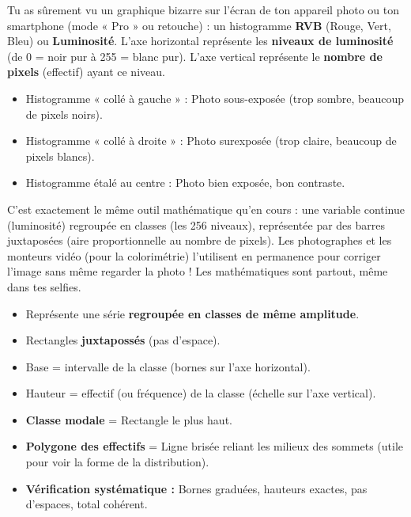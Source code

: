 \documentclass[11pt]{article}
\begin{document}
\begin{savaistu}
Tu as sûrement vu un graphique bizarre sur l'écran de ton appareil photo ou ton smartphone (mode « Pro » ou retouche) : un histogramme \textbf{RVB} (Rouge, Vert, Bleu) ou \textbf{Luminosité}.
L'axe horizontal représente les \textbf{niveaux de luminosité} (de 0 = noir pur à 255 = blanc pur). L'axe vertical représente le \textbf{nombre de pixels} (effectif) ayant ce niveau.
\begin{itemize}
    \item Histogramme « collé à gauche » : Photo sous-exposée (trop sombre, beaucoup de pixels noirs).
    \item Histogramme « collé à droite » : Photo surexposée (trop claire, beaucoup de pixels blancs).
    \item Histogramme étalé au centre : Photo bien exposée, bon contraste.
\end{itemize}
C'est exactement le même outil mathématique qu'en cours : une variable continue (luminosité) regroupée en classes (les 256 niveaux), représentée par des barres juxtaposées (aire proportionnelle au nombre de pixels). Les photographes et les monteurs vidéo (pour la colorimétrie) l'utilisent en permanence pour corriger l'image sans même regarder la photo ! Les mathématiques sont partout, même dans tes selfies.
\end{savaistu}

\begin{aretenir}
\begin{itemize}
    \item Représente une série \textbf{regroupée en classes de même amplitude}.
    \item Rectangles \textbf{juxtapossés} (pas d'espace).
    \item Base = intervalle de la classe (bornes sur l'axe horizontal).
    \item Hauteur = effectif (ou fréquence) de la classe (échelle sur l'axe vertical).
    \item \textbf{Classe modale} = Rectangle le plus haut.
    \item \textbf{Polygone des effectifs} = Ligne brisée reliant les milieux des sommets (utile pour voir la forme de la distribution).
    \item \textbf{Vérification systématique :} Bornes graduées, hauteurs exactes, pas d'espaces, total cohérent.
\end{itemize}
\end{aretenir}
\end{document}
